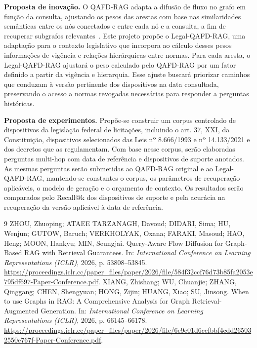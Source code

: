 \documentclass[11pt,a4paper]{article}
\begin{document}
\textbf{Proposta de inovação.} O QAFD-RAG adapta a difusão de fluxo no grafo em função da consulta, ajustando os pesos das arestas com base nas similaridades semânticas entre os nós conectados e entre cada nó e a consulta, a fim de recuperar subgrafos relevantes~\cite{qafd}. Este projeto propõe o Legal-QAFD-RAG, uma adaptação para o contexto legislativo que incorpora ao cálculo desses pesos informações de vigência e relações hierárquicas entre normas. Para cada aresta, o Legal-QAFD-RAG ajustará o peso calculado pelo QAFD-RAG por um fator definido a partir da vigência e hierarquia. Esse ajuste buscará priorizar caminhos que conduzam à versão pertinente dos dispositivos na data consultada, preservando o acesso a normas revogadas necessárias para responder a perguntas históricas. 

\textbf{Proposta de experimentos.} Propõe-se construir um corpus controlado de dispositivos da legislação federal de licitações, incluindo o art. 37, XXI, da Constituição, dispositivos selecionados das Leis nº 8.666/1993 e nº 14.133/2021 e dos decretos que as regulamentam. Com base nesse corpus, serão elaboradas perguntas multi-hop com data de referência e dispositivos de suporte anotados. As mesmas perguntas serão submetidas ao QAFD-RAG original e ao Legal-QAFD-RAG, mantendo-se constantes o corpus, os parâmetros de recuperação aplicáveis, o modelo de geração e o orçamento de contexto. Os resultados serão comparados pelo Recall@k dos dispositivos de suporte e pela acurácia na recuperação da versão aplicável à data de referência.

\begin{thebibliography}{9}\footnotesize
\setlength{\itemsep}{-0.25em}
 ZHOU, Zhuoping; ATAEE TARZANAGH, Davoud; DIDARI, Sima; HU, Wenjun; GUTOW, Baruch; VERKHOLYAK, Oxana; FARAKI, Masoud; HAO, Heng; MOON, Hankyu; MIN, Seungjai. Query-Aware Flow Diffusion for Graph-Based RAG with Retrieval Guarantees. In: \emph{International Conference on Learning Representations (ICLR)}, 2026, p. 53808--53845. \url{https://proceedings.iclr.cc/paper_files/paper/2026/file/584f32ccf76d73b85fa2053e795df697-Paper-Conference.pdf}.
 XIANG, Zhishang; WU, Chuanjie; ZHANG, Qinggang; CHEN, Shengyuan; HONG, Zijin; HUANG, Xiao; SU, Jinsong. When to use Graphs in RAG: A Comprehensive Analysis for Graph Retrieval-Augmented Generation. In: \emph{International Conference on Learning Representations (ICLR)}, 2026, p. 66145--66178. \url{https://proceedings.iclr.cc/paper_files/paper/2026/file/6c9e01d6cefbbf4cdd265032550e767f-Paper-Conference.pdf}.
\end{thebibliography}
\end{document}
